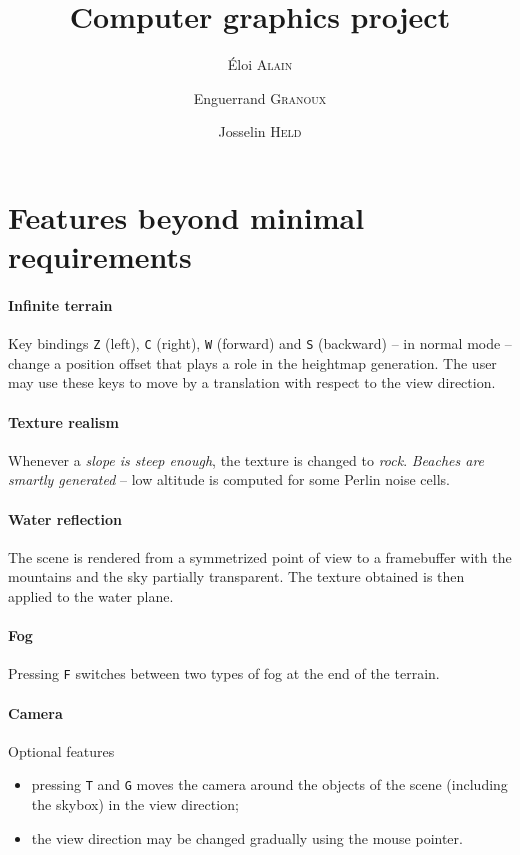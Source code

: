 \documentclass[12pt]{article}
\begin{document}
\title{Computer graphics project}
\author{Éloi \textsc{Alain} \and Enguerrand \textsc{Granoux} \and Josselin \textsc{Held}}
\date{}

\maketitle

\tableofcontents

\section{Features beyond minimal requirements}

\paragraph{Infinite terrain} Key bindings \texttt{Z} (left), \texttt{C} (right), \texttt{W} (forward) and \texttt{S} (backward) -- in normal mode -- change a position offset that plays a role in the heightmap generation. The user may use these keys to move by a translation with respect to the view direction.

\paragraph{Texture realism} Whenever a \textit{slope is steep enough}, the texture is changed to \textit{rock}. \textit{Beaches are smartly generated} -- low altitude is computed for some Perlin noise cells.

\paragraph{Water reflection} The scene is rendered from a symmetrized point of view to a framebuffer with the mountains and the sky partially transparent. The texture obtained is then applied to the water plane.

\paragraph{Fog} Pressing \texttt{F} switches between two types of fog at the end of the terrain.

\paragraph{Camera} Optional features
\begin{itemize}
\item pressing \texttt{T} and \texttt{G} moves the camera around the objects of the scene (including the skybox) in the view direction;
\item the view direction may be changed gradually using the mouse pointer.
\end{itemize}
\end{document}
